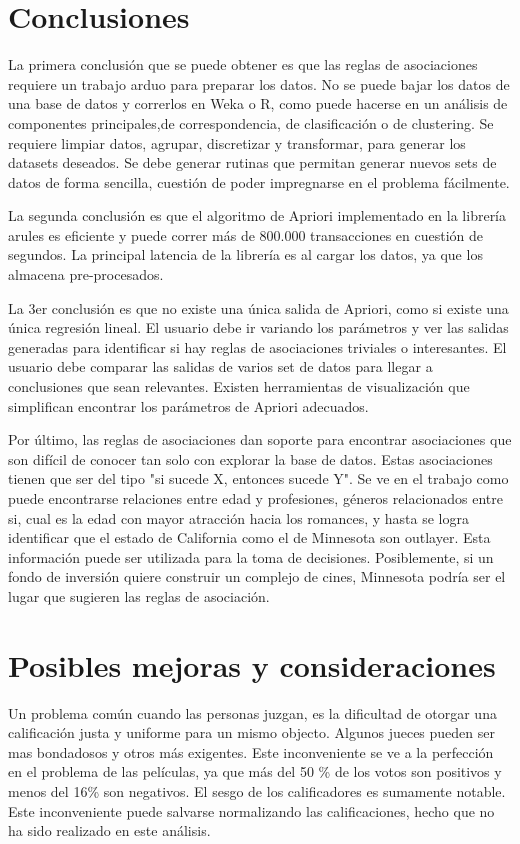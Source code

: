 \documentclass[journal]{IEEEtran}
\begin{document}
\section{Conclusiones}
La primera conclusión que se puede obtener es que las reglas de asociaciones requiere
un trabajo arduo para preparar los datos. No se puede bajar los datos de una base de datos
y correrlos en Weka o R, como puede hacerse en un análisis de componentes 
principales,de correspondencia, de clasificación o de clustering. Se requiere limpiar 
datos, agrupar, discretizar y transformar, 
para generar los datasets deseados. Se debe generar rutinas que permitan generar nuevos
sets de datos de forma sencilla, cuestión de poder impregnarse en el problema fácilmente.

La segunda conclusión es que el algoritmo de Apriori implementado en la librería arules
es eficiente y puede correr más de 800.000 transacciones en cuestión de segundos. La principal
latencia de la librería es al cargar los datos, ya que los almacena pre-procesados.

La 3er conclusión es que no existe una única salida de Apriori, como si existe una única
regresión lineal. El usuario debe ir variando
los parámetros y ver las salidas generadas para identificar si hay reglas de asociaciones
triviales o interesantes. El usuario debe comparar las salidas de varios set de datos para
llegar a conclusiones que sean relevantes. Existen herramientas de visualización que simplifican
encontrar los parámetros de Apriori adecuados.

Por último, las reglas de asociaciones dan soporte para encontrar asociaciones
que son difícil de conocer tan solo con explorar la base de datos. Estas asociaciones tienen
que ser del tipo "si sucede X, entonces sucede Y". Se ve en el trabajo
como puede encontrarse relaciones entre edad y profesiones, géneros relacionados entre si,
cual es la edad con mayor atracción hacia los romances, y hasta se logra identificar
que el estado de California como el de Minnesota son outlayer. Esta información puede
ser utilizada para la toma de decisiones. Posiblemente, si un
fondo de inversión quiere construir un complejo de cines, Minnesota podría ser el 
lugar que sugieren las reglas de asociación.

\section{Posibles mejoras y consideraciones}

Un problema común cuando las personas juzgan, es la dificultad de otorgar una
calificación justa y uniforme para un mismo objecto. Algunos jueces pueden ser
mas bondadosos y otros más exigentes. Este inconveniente se ve a la perfección
en el problema de las películas, ya que más del 50 \% de los votos son positivos
y menos del 16\% son negativos. El sesgo de los calificadores es sumamente notable.
Este inconveniente puede salvarse normalizando las calificaciones, hecho que no
ha sido realizado en este análisis.
\end{document}
